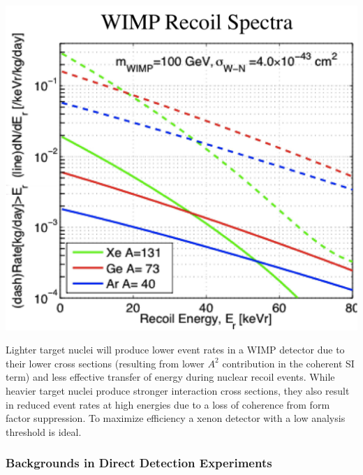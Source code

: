 \documentclass[a4paper,12pt]{article}
\begin{document}
\begin{center}
\includegraphics[scale=0.5]{Recoil-spectrum.png}
\end{center}

Lighter target nuclei will produce lower event rates in a WIMP detector due to their lower cross sections (resulting from lower $A^2$ contribution in the coherent SI term) and less effective transfer of energy during nuclear recoil events. While heavier target nuclei produce stronger interaction cross sections, they also result in reduced event rates at high energies due to a loss of coherence from form factor suppression.  To maximize efficiency a xenon detector with a low analysis threshold is ideal.


\subsubsection{Backgrounds in Direct Detection Experiments} \label{Backgrounds}
\end{document}
